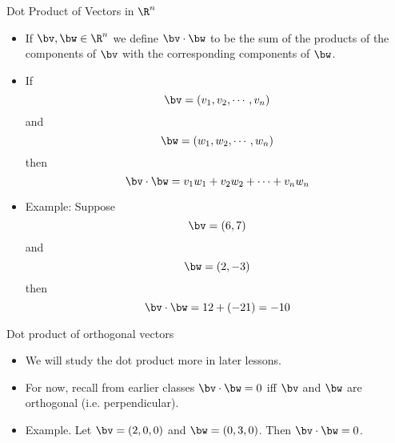 \documentclass{beamer}
\begin{document}
\begin{frame}{Dot Product of Vectors in $\R^n$}

\begin{itemize}
\item If $\bv, \bw \in \R^n$ we define $\bv \cdot \bw$ to be the sum of the products of the components of $\bv$ with the corresponding components of $\bw$.
\item If $$\bv=(v_1, v_2, \cdots , v_n)$$ and $$\bw=(w_1, w_2, \cdots, w_n)$$
then $$\bv \cdot \bw = v_1  w_1 +  v_2  w_2 + \cdots +  v_n  w_n$$
\item Example: Suppose $$\bv = (6, 7)$$ and $$\bw=(2, -3)$$ then
$$\bv \cdot \bw= 12 + (-21) = -10$$
\end{itemize}

\end{frame}

\begin{frame}{Dot product of orthogonal vectors}

\begin{itemize}
\item We will study the dot product more in later lessons.
\item For now, recall from earlier classes $\bv \cdot \bw = 0$ iff
$\bv$ and $\bw$ are orthogonal (i.e. perpendicular).
\item Example. Let $\bv=(2, 0, 0)$ and $\bw = (0, 3, 0)$.
Then $\bv \cdot \bw = 0$.
\end{itemize}

\end{frame}
\end{document}
